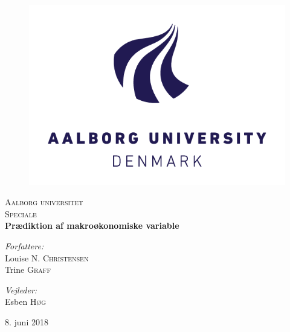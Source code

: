 \begin{titlepage}
\begin{center}


\begin{figure}[htbp]
	\centering
	\includegraphics[width=\textwidth]{./fig/aaulogo.jpg}
\end{figure}

\vspace{2cm}


\textsc{\LARGE Aalborg universitet}\\
\textsc{\Large Speciale}\\[0.5cm]

{ \huge \bfseries Prædiktion af makroøkonomiske variable\\[1.4cm] }



\begin{minipage}{0.4\textwidth}
\begin{flushleft} \large
\emph{Forfattere:}\\
Louise  \textsc{N. Christensen}\\
Trine \textsc{Graff}\\

\end{flushleft}
\end{minipage}
\begin{minipage}{0.4\textwidth}
\begin{flushright} \large
\emph{Vejleder:} \\
Esben \textsc{Høg}\\
\phantom{hej}

\end{flushright}
\end{minipage}

\vfill

{\large 8. juni 2018}

\end{center}
\end{titlepage}
